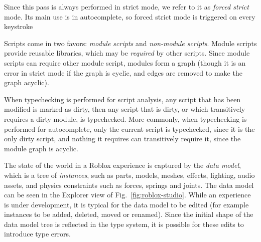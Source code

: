 \documentclass[english,submission,cleveref]{programming}
\begin{document}
Since this pass is always performed in strict mode, we refer to it as
\emph{forced strict} mode. Its main use is in autocomplete, so forced
strict mode is triggered on every keystroke

Scripts come in two favors: \emph{module scripts} and \emph{non-module
scripts}.  Module scripts provide reusable libraries, which may be
\emph{required} by other scripts. Since module scripts can require
other module script, modules form a graph (though it is
an error in strict mode if the graph is cyclic, and edges are removed to
make the graph acyclic).

When typechecking is performed for script analysis, any script that
has been modified is marked as dirty, then any script that is dirty,
or which transitively requires a dirty module, is typechecked. More
commonly, when typechecking is performed for autocomplete, only
the current script is typechecked, since it is the only dirty
script, and nothing it requires can transitively require it, since
the module graph is acyclic.

The state of the world in a {Roblox} experience is captured by
the \emph{data model}, which is a tree of \emph{instances}, such as
parts, models, meshes, effects, lighting, audio assets, and physics
constraints such as forces, springs and joints.
The data model can be seen in the Explorer view of Fig.~\ref{fig:roblox-studio}.
While an experience is under development, it is typical for the data
model to be edited (for example instances to be added, deleted, moved
or renamed). Since the initial shape of the data model tree is reflected in
the type system, it is possible for these edits to introduce type errors.
\end{document}
